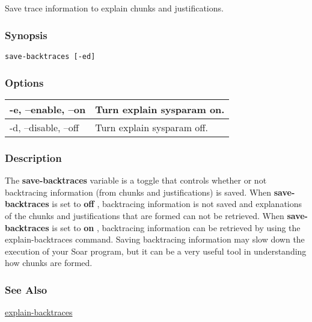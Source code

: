 \subsection{}
\label{save-backtraces}
Save trace information to explain chunks and justifications. 
\subsubsection*{Synopsis}
\begin{verbatim}
save-backtraces [-ed]
\end{verbatim}
\subsubsection*{Options}
\begin{tabular}{|l|l|}
\hline 
 -e, --enable, --on  & Turn explain sysparam on.  \\
 \hline 
 -d, --disable, --off  & Turn explain sysparam off.  \\
 \hline 
\end{tabular}
\subsubsection*{Description}
 The \textbf{save-backtraces}
 variable is a toggle that controls whether or not backtracing information (from chunks and justifications) is saved. 
 When \textbf{save-backtraces}
 is set to \textbf{off}
, backtracing information is not saved and explanations of the chunks and justifications that are formed can not be retrieved. When \textbf{save-backtraces}
 is set to \textbf{on}
, backtracing information can be retrieved by using the explain-backtraces command. Saving backtracing information may slow down the execution of your Soar program, but it can be a very useful tool in understanding how chunks are formed. 
\subsubsection*{See Also}
\hyperref[explain-backtraces]{explain-backtraces} 